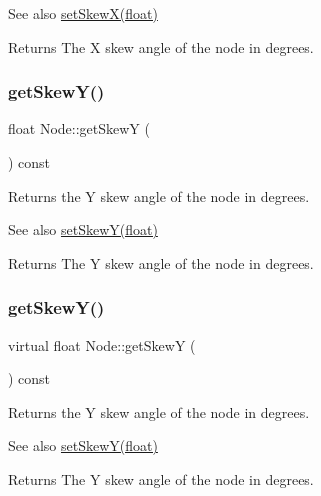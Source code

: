 \begin{DoxySeeAlso}{See also}
{\ttfamily \hyperlink{classNode_a48cf4d7b304b57a3f593d9eecde3ac7f}{set\+Skew\+X(float)}}
\end{DoxySeeAlso}
\begin{DoxyReturn}{Returns}
The X skew angle of the node in degrees. 
\end{DoxyReturn}
\mbox{\label{classNode_a260877f2b51c284555fc272c7ba28f46}} 
\subsubsection{\texorpdfstring{get\+Skew\+Y()}{getSkewY()}\hspace{0.1cm}{\footnotesize\ttfamily [1/2]}}
{\footnotesize\ttfamily float Node\+::get\+SkewY (\begin{DoxyParamCaption}{ }\end{DoxyParamCaption}) const\hspace{0.3cm}{\ttfamily [virtual]}}

Returns the Y skew angle of the node in degrees.

\begin{DoxySeeAlso}{See also}
{\ttfamily \hyperlink{classNode_ac1f4c4be8099a0d4bca1464c51f81f94}{set\+Skew\+Y(float)}}
\end{DoxySeeAlso}
\begin{DoxyReturn}{Returns}
The Y skew angle of the node in degrees. 
\end{DoxyReturn}
\mbox{\label{classNode_a005a75fa3bd0937f475c0846692d232f}} 
\subsubsection{\texorpdfstring{get\+Skew\+Y()}{getSkewY()}\hspace{0.1cm}{\footnotesize\ttfamily [2/2]}}
{\footnotesize\ttfamily virtual float Node\+::get\+SkewY (\begin{DoxyParamCaption}{ }\end{DoxyParamCaption}) const\hspace{0.3cm}{\ttfamily [virtual]}}

Returns the Y skew angle of the node in degrees.

\begin{DoxySeeAlso}{See also}
{\ttfamily \hyperlink{classNode_ac1f4c4be8099a0d4bca1464c51f81f94}{set\+Skew\+Y(float)}}
\end{DoxySeeAlso}
\begin{DoxyReturn}{Returns}
The Y skew angle of the node in degrees. 
\end{DoxyReturn}
\mbox{\label{classNode_a9f18b6db8146f2660e8761bb9557d1fe}} 
